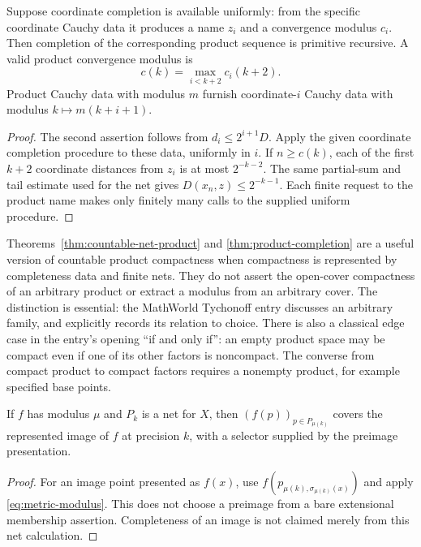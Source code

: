 \begin{theorem}
\label{thm:product-completion}
Suppose coordinate completion is available uniformly: from the specific
coordinate Cauchy data it produces a name $z_i$ and a convergence modulus
$c_i$.  Then completion of the corresponding product sequence is
primitive recursive.  A valid product convergence modulus is
\begin{equation}\label{eq:product-completion-rate}
 c(k)=\max_{i<k+2}c_i(k+2).
\end{equation}
Product Cauchy data with modulus $m$ furnish coordinate-$i$ Cauchy data
with modulus $k\mapsto m(k+i+1)$.
\end{theorem}
\begin{proof}
The second assertion follows from
$d_i\leq 2^{i+1}D$.  Apply the given coordinate completion procedure to
these data, uniformly in $i$.  If $n\geq c(k)$, each of the first $k+2$
coordinate distances from $z_i$ is at most $2^{-k-2}$.  The same
partial-sum and tail estimate used for the net gives
$D(x_n,z)\leq 2^{-k-1}$.  Each finite request to the product name makes
only finitely many calls to the supplied uniform procedure.
\end{proof}

Theorems~\ref{thm:countable-net-product} and
\ref{thm:product-completion} are a useful version of countable product
compactness when compactness is represented by completeness data and
finite nets.  They do not assert the open-cover compactness of an
arbitrary product or extract a modulus from an arbitrary cover.
The distinction is essential: the MathWorld Tychonoff entry discusses an
arbitrary family, and explicitly records its relation to choice.
There is also a classical edge case in the entry's opening ``if and only
if'': an empty product space may be compact even if one of its other
factors is noncompact.  The converse from compact product to compact
factors requires a nonempty product, for example specified base points.

\begin{proposition}\label{prop:image-nets}
If $f$ has modulus $\mu$ and $P_k$ is a net for $X$, then
$(f(p))_{p\in P_{\mu(k)}}$ covers the represented image of $f$ at
precision $k$, with a selector supplied by the preimage presentation.
\end{proposition}
\begin{proof}
For an image point presented as $f(x)$, use
$f(p_{\mu(k),\sigma_{\mu(k)}(x)})$ and apply
\eqref{eq:metric-modulus}.  This does not choose a preimage from a bare
extensional membership assertion.  Completeness of an image is not
claimed merely from this net calculation.
\end{proof}

